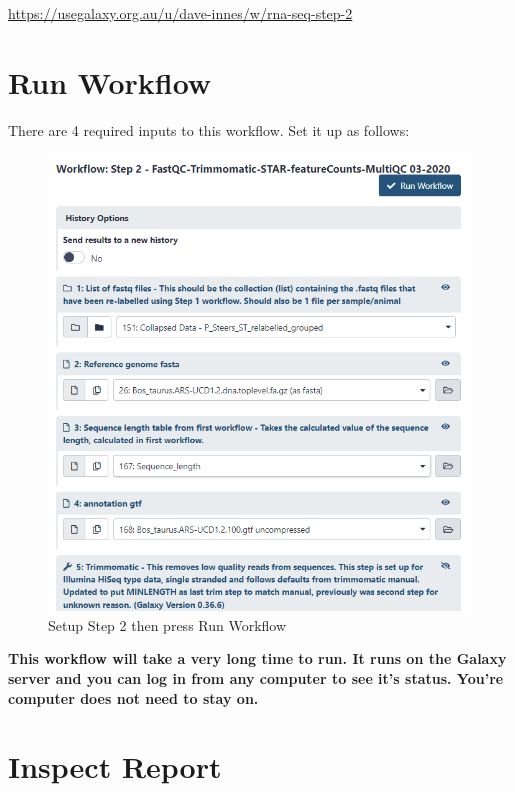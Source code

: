 \documentclass[
]{book}
\begin{document}
\url{https://usegalaxy.org.au/u/dave-innes/w/rna-seq-step-2}

\hypertarget{run-workflow-1}{%
\section{Run Workflow}\label{run-workflow-1}}

There are 4 required inputs to this workflow. Set it up as follows:

\begin{figure}

{\centering \includegraphics[width=1\linewidth]{images/image_step2} 

}

\caption{Setup Step 2 then press Run Workflow}\label{fig:run-workflow-step2}
\end{figure}

\textbf{This workflow will take a very long time to run. It runs on the Galaxy server and you can log in from any computer to see it's status. You're computer does not need to stay on.}

\hypertarget{inspect-report}{%
\section{Inspect Report}\label{inspect-report}}
\end{document}
